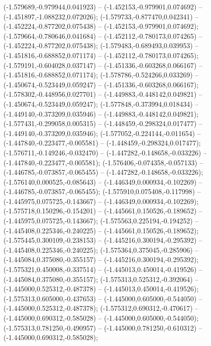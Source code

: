  (-1.579689,-0.979944,0.041923) -- (-1.452153,-0.979901,0.074692) -- (-1.451897,-1.088232,0.072026);
 (-1.579733,-0.877470,0.042341) -- (-1.452224,-0.877202,0.075438) -- (-1.452153,-0.979901,0.074692);
 (-1.579664,-0.780646,0.041684) -- (-1.452112,-0.780173,0.074265) -- (-1.452224,-0.877202,0.075438);
 (-1.579483,-0.689493,0.039953) -- (-1.451816,-0.688852,0.071174) -- (-1.452112,-0.780173,0.074265);
 (-1.579191,-0.604028,0.037147) -- (-1.451336,-0.603268,0.066167) -- (-1.451816,-0.688852,0.071174);
 (-1.578786,-0.524266,0.033269) -- (-1.450674,-0.523449,0.059247) -- (-1.451336,-0.603268,0.066167);
 (-1.578302,-0.448956,0.027701) -- (-1.449883,-0.448142,0.049821) -- (-1.450674,-0.523449,0.059247);
 (-1.577848,-0.373994,0.018434) -- (-1.449140,-0.373209,0.035946) -- (-1.449883,-0.448142,0.049821);
 (-1.577431,-0.299058,0.005315) -- (-1.448459,-0.298324,0.017477) -- (-1.449140,-0.373209,0.035946);
 (-1.577052,-0.224144,-0.011654) -- (-1.447840,-0.223477,-0.005581) -- (-1.448459,-0.298324,0.017477);
 (-1.576711,-0.149246,-0.032470) -- (-1.447282,-0.148658,-0.033226) -- (-1.447840,-0.223477,-0.005581);
 (-1.576406,-0.074358,-0.057133) -- (-1.446785,-0.073857,-0.065455) -- (-1.447282,-0.148658,-0.033226);
 (-1.576140,0.000525,-0.085643) -- (-1.446349,0.000934,-0.102269) -- (-1.446785,-0.073857,-0.065455);
 (-1.575910,0.075408,-0.117998) -- (-1.445975,0.075725,-0.143667) -- (-1.446349,0.000934,-0.102269);
 (-1.575718,0.150296,-0.154201) -- (-1.445661,0.150526,-0.189652) -- (-1.445975,0.075725,-0.143667);
 (-1.575563,0.225194,-0.194252) -- (-1.445408,0.225346,-0.240225) -- (-1.445661,0.150526,-0.189652);
 (-1.575445,0.300109,-0.238153) -- (-1.445216,0.300194,-0.295392) -- (-1.445408,0.225346,-0.240225);
 (-1.575364,0.375045,-0.285906) -- (-1.445084,0.375080,-0.355157) -- (-1.445216,0.300194,-0.295392);
 (-1.575321,0.450008,-0.337514) -- (-1.445013,0.450014,-0.419526) -- (-1.445084,0.375080,-0.355157);
 (-1.575313,0.525312,-0.392064) -- (-1.445000,0.525312,-0.487378) -- (-1.445013,0.450014,-0.419526);
 (-1.575313,0.605000,-0.437653) -- (-1.445000,0.605000,-0.544050) -- (-1.445000,0.525312,-0.487378);
 (-1.575312,0.690312,-0.470617) -- (-1.445000,0.690312,-0.585028) -- (-1.445000,0.605000,-0.544050);
 (-1.575313,0.781250,-0.490957) -- (-1.445000,0.781250,-0.610312) -- (-1.445000,0.690312,-0.585028);

